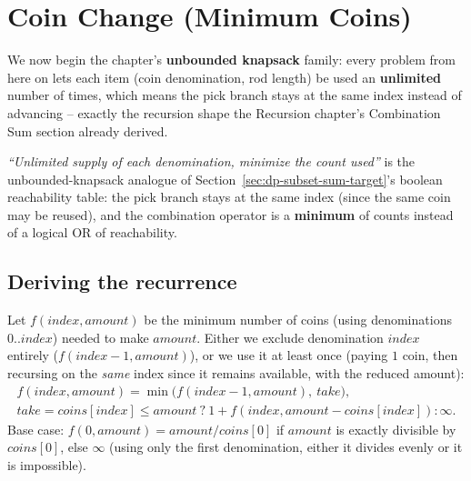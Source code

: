 \section{Coin Change (Minimum Coins)}
\label{sec:dp-coin-change}

\noindent We now begin the chapter's \textbf{unbounded knapsack} family:
every problem from here on lets each item (coin denomination, rod
length) be used an \textbf{unlimited} number of times, which means the
pick branch stays at the same index instead of advancing -- exactly the
recursion shape the Recursion chapter's Combination Sum section
already derived.


\begin{patternbox}
\emph{``Unlimited supply of each denomination, minimize the count
used''} is the unbounded-knapsack analogue of
Section~\ref{sec:dp-subset-sum-target}'s boolean reachability table: the
pick branch stays at the same index (since the same coin may be reused),
and the combination operator is a \textbf{minimum} of counts instead of a
logical OR of reachability.
\end{patternbox}

\subsection*{Deriving the recurrence}

Let $f(\textit{index}, \textit{amount})$ be the minimum number of coins
(using denominations $0..\textit{index}$) needed to make
$\textit{amount}$. Either we exclude denomination $\textit{index}$
entirely ($f(\textit{index}-1, \textit{amount})$), or we use it at least
once (paying $1$ coin, then recursing on the \emph{same} index since it
remains available, with the reduced amount):
\begin{gather*}
  f(\textit{index}, \textit{amount}) = \min\Big(
  f(\textit{index}{-}1, \textit{amount}),\ \textit{take} \Big), \\
  \textit{take} = \textit{coins}[\textit{index}] \le \textit{amount}\ ?\
  1 + f(\textit{index}, \textit{amount}-\textit{coins}[\textit{index}]) :
  \infty.
\end{gather*}
Base case: $f(0, \textit{amount}) = \textit{amount} /
\textit{coins}[0]$ if $\textit{amount}$ is exactly divisible by
$\textit{coins}[0]$, else $\infty$ (using only the first denomination,
either it divides evenly or it is impossible).

